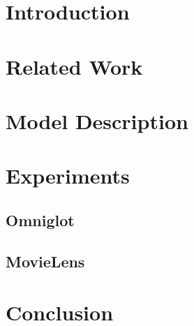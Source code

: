 \documentclass{article}
\begin{document}
\section{Introduction}
\label{sec:intro}


\section{Related Work}
\label{sec:related}


\section{Model Description}
\label{sec:model}


\section{Experiments}
\label{sec:exp}
\subsection{Omniglot}
\label{sec:omniglot}


\subsection{MovieLens}
\label{sec:movielens}


\section{Conclusion}
\label{sec:conc}


{\footnotesize


}
\end{document}
